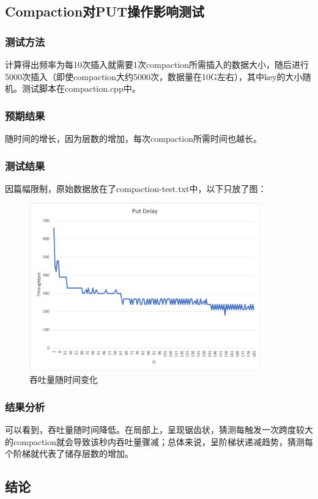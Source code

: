 \documentclass{ctexart}
\begin{document}
\subsection{Compaction对PUT操作影响测试}

\subsubsection{测试方法}
计算得出频率为每10次插入就需要1次compaction所需插入的数据大小，随后进行5000次插入（即使compaction大约5000次，数据量在10G左右），其中key的大小随机。测试脚本在compaction.cpp中。

\subsubsection{预期结果}
随时间的增长，因为层数的增加，每次compaction所需时间也越长。

\subsubsection{测试结果}
因篇幅限制，原始数据放在了compaction-test.txt中，以下只放了图：
\begin{figure}[h!]
  \centering
  \includegraphics[width=10cm]{Compaction.png}
  \caption{吞吐量随时间变化}
\end{figure}

\subsubsection{结果分析}
可以看到，吞吐量随时间降低。在局部上，呈现锯齿状，猜测每触发一次跨度较大的compaction就会导致该秒内吞吐量骤减；总体来说，呈阶梯状递减趋势，猜测每个阶梯就代表了储存层数的增加。


\subsection{结论}
\end{document}
